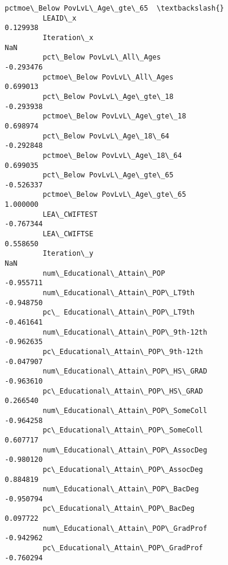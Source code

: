 \documentclass[11pt]{article}
\begin{document}
\begin{Verbatim}[commandchars=\\\{\}]
                                                    pctmoe\_Below PovLvL\_Age\_gte\_65  \textbackslash{}
         LEAID\_x                                                          0.129938   
         Iteration\_x                                                           NaN   
         pct\_Below PovLvL\_All\_Ages                                       -0.293476   
         pctmoe\_Below PovLvL\_All\_Ages                                     0.699013   
         pct\_Below PovLvL\_Age\_gte\_18                                     -0.293938   
         pctmoe\_Below PovLvL\_Age\_gte\_18                                   0.698974   
         pct\_Below PovLvL\_Age\_18\_64                                      -0.292848   
         pctmoe\_Below PovLvL\_Age\_18\_64                                    0.699035   
         pct\_Below PovLvL\_Age\_gte\_65                                     -0.526337   
         pctmoe\_Below PovLvL\_Age\_gte\_65                                   1.000000   
         LEA\_CWIFTEST                                                    -0.767344   
         LEA\_CWIFTSE                                                      0.558650   
         Iteration\_y                                                           NaN   
         num\_Educational\_Attain\_POP                                      -0.955711   
         num\_Educational\_Attain\_POP\_LT9th                                -0.948750   
         pc\_ Educational\_Attain\_POP\_LT9th                                -0.461641   
         num\_Educational\_Attain\_POP\_9th-12th                             -0.962635   
         pc\_Educational\_Attain\_POP\_9th-12th                              -0.047907   
         num\_Educational\_Attain\_POP\_HS\_GRAD                              -0.963610   
         pc\_Educational\_Attain\_POP\_HS\_GRAD                                0.266540   
         num\_Educational\_Attain\_POP\_SomeColl                             -0.964258   
         pc\_Educational\_Attain\_POP\_SomeColl                               0.607717   
         num\_Educational\_Attain\_POP\_AssocDeg                             -0.980120   
         pc\_Educational\_Attain\_POP\_AssocDeg                               0.884819   
         num\_Educational\_Attain\_POP\_BacDeg                               -0.950794   
         pc\_Educational\_Attain\_POP\_BacDeg                                 0.097722   
         num\_Educational\_Attain\_POP\_GradProf                             -0.942962   
         pc\_Educational\_Attain\_POP\_GradProf                              -0.760294   

\end{Verbatim}
\end{document}
